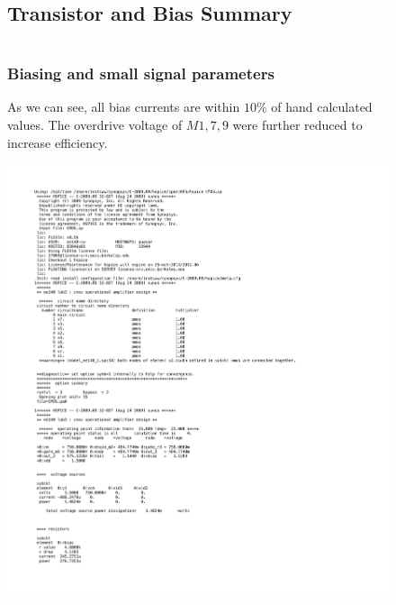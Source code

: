 \documentclass[]{article}
\begin{document}
		\begin{figure}
			\subsection{Transistor and Bias Summary}
				$$$$
				\subsubsection{Biasing and small signal parameters}
				As we can see, all bias currents are within $10\%$ of hand calculated values. The overdrive voltage of $M1,7,9$ were further reduced to increase efficiency.
				
				\includegraphics[width=1.25\textwidth]{operating_point.pdf}
		\end{figure}
		
\end{document}
